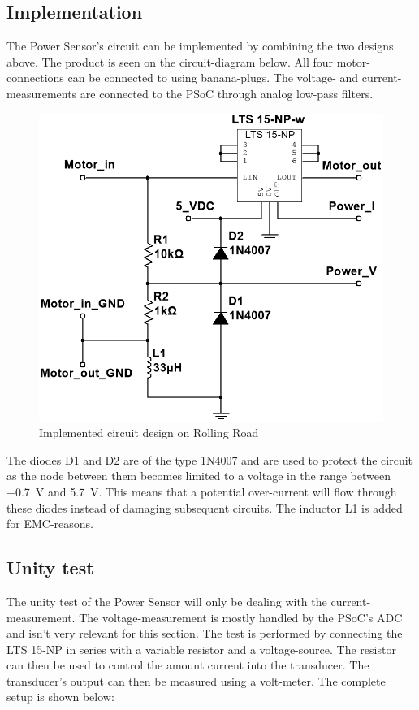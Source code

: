 \subsection{Implementation}
The Power Sensor's circuit can be implemented by combining the two designs above. The product is seen on the circuit-diagram below. All four motor-connections can be connected to using banana-plugs. The voltage- and current-measurements are connected to the PSoC through analog low-pass filters.

\begin{figure}[H]
	\centering
	\includegraphics[width=0.7\linewidth]{Hardware/Pictures/PowerSensor_circuit}
	\caption{Implemented circuit design on Rolling Road}
	\label{fig:PowerSensor_circuit}
\end{figure}

The diodes D1 and D2 are of the type 1N4007\cite{1N4007} and are used to protect the circuit as the node between them becomes limited to a voltage in the range between \SI{-0.7}{\volt} and \SI{5.7}{\volt}. This means that a potential over-current will flow through these diodes instead of damaging subsequent circuits. The inductor L1 is added for EMC-reasons\cite{EMC}.

\subsection{Unity test}
\label{sec:PowerSensorTest}
The unity test of the Power Sensor will only be dealing with the current-measurement. The voltage-measurement is mostly handled by the PSoC's ADC and isn't very relevant for this section. The test is performed by connecting the LTS 15-NP in series with a variable resistor and a voltage-source. The resistor can then be used to control the amount current into the transducer. The transducer's output can then be measured using a volt-meter. The complete setup is shown below:

